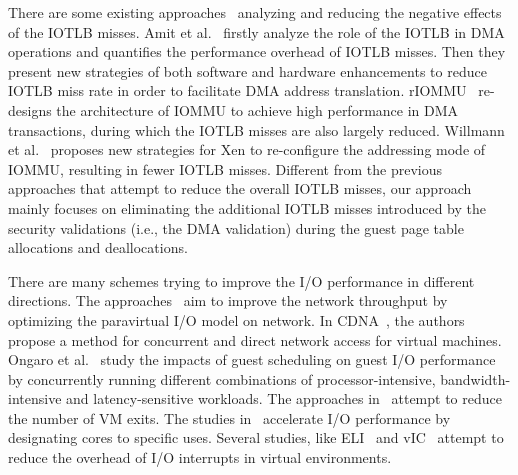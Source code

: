 There are some existing approaches~\cite{amit2012iommu, malka2015riommu, willmann2008protection} analyzing and reducing the negative effects of the IOTLB misses.
Amit et al.~\cite{amit2012iommu} firstly analyze the role of the IOTLB in DMA operations and quantifies the performance overhead of IOTLB misses. Then they present new strategies of both software and hardware enhancements to reduce IOTLB miss rate in order to facilitate DMA address translation. rIOMMU~\cite{malka2015riommu} re-designs the architecture of IOMMU to achieve high performance in DMA transactions, during which the IOTLB misses are also largely reduced. Willmann et al.~\cite{willmann2008protection} proposes new strategies for Xen to re-configure the addressing mode of IOMMU, resulting in fewer IOTLB misses.
Different from the previous approaches that attempt to reduce the overall IOTLB misses, our approach mainly focuses on eliminating the additional IOTLB misses introduced by the security validations (i.e., the DMA validation) during the guest page table allocations and deallocations.

There are many schemes trying to improve the I/O performance in different directions.
The approaches~\cite{menon2006optimizing,4734994,santos2008bridging} aim to improve the network throughput by optimizing the paravirtual I/O model on network.
In CDNA~\cite{cdna}, the authors propose a method for concurrent and direct network access for virtual machines.
Ongaro et al.~\cite{ongaro2008scheduling} study the impacts of guest scheduling on guest I/O performance by concurrently running different combinations of processor-intensive, bandwidth-intensive and latency-sensitive workloads. The approaches in~\cite{gordon2012towards,har2013efficient} attempt to reduce the number of VM exits. The studies in~\cite{liao2008software,liu2009virtualization,shalev2010isostack,landau2011splitx,xu2013vturbo} accelerate I/O performance by  designating cores to specific uses.
Several studies, like ELI~\cite{eli} and vIC~\cite{vic} attempt to reduce the overhead of I/O interrupts in virtual environments.




